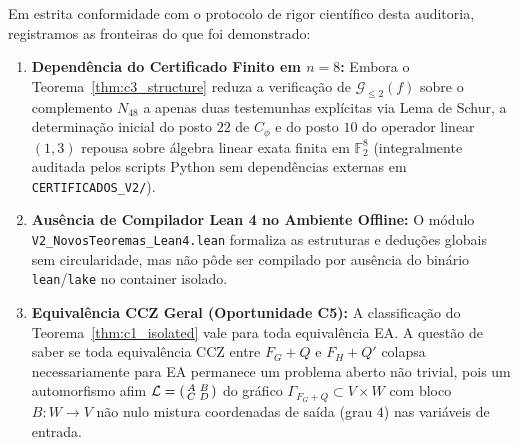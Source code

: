 \documentclass[11pt,a4paper]{article}
\theoremstyle{definition}
\theoremstyle{remark}
\newcommand{\F}{\mathbb{F}_2}
\begin{document}
Em estrita conformidade com o protocolo de rigor científico desta auditoria, registramos as fronteiras do que foi demonstrado:
\begin{enumerate}
  \item \textbf{Dependência do Certificado Finito em $n=8$:} Embora o Teorema~\ref{thm:c3_structure} reduza a verificação de $\mathcal{G}_{\le 2}(f)$ sobre o complemento $N_{48}$ a apenas duas testemunhas explícitas via Lema de Schur, a determinação inicial do posto $22$ de $C_\phi$ e do posto $10$ do operador linear $(1,3)$ repousa sobre álgebra linear exata finita em $\F^8$ (integralmente auditada pelos scripts Python sem dependências externas em \texttt{CERTIFICADOS\_V2/}).
  \item \textbf{Ausência de Compilador Lean 4 no Ambiente Offline:} O módulo \texttt{V2\_NovosTeoremas\_\allowbreak Lean4.lean} formaliza as estruturas e deduções globais sem circularidade, mas não pôde ser compilado por ausência do binário \texttt{lean}/\texttt{lake} no container isolado.
  \item \textbf{Equivalência CCZ Geral (Oportunidade C5):} A classificação do Teorema~\ref{thm:c1_isolated} vale para toda equivalência EA. A questão de saber se toda equivalência CCZ entre $F_G+Q$ e $F_H+Q'$ colapsa necessariamente para EA permanece um problema aberto não trivial, pois um automorfismo afim $\mathcal{L} = \begin{psmallmatrix} A & B \\ C & D \end{psmallmatrix}$ do gráfico $\Gamma_{F_G+Q} \subset V \times W$ com bloco $B : W \to V$ não nulo mistura coordenadas de saída (grau $4$) nas variáveis de entrada.
\end{enumerate}
\end{document}
